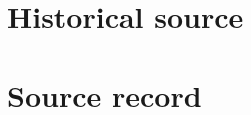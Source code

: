 \documentclass{article}
\begin{document}
\section*{Historical source}
\section*{Source record}
\end{document}
